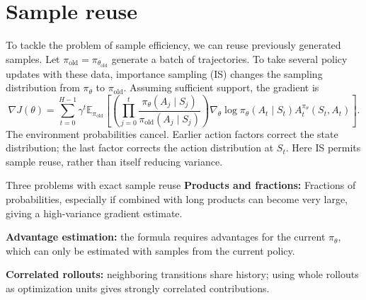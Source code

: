 \documentclass[11pt,a4paper]{article}
\newcommand{\E}{\mathbb{E}}
\newcommand{\old}{\mathrm{old}}
\newcommand{\nexttopic}{\clearpage}
\begin{document}
\nexttopic
\section{Sample reuse}
To tackle the problem of sample efficiency, we can reuse previously generated samples. 
Let $\pi_\old=\pi_{\theta_\old}$ generate a batch of trajectories. To take several policy updates
with these data, importance sampling (IS) changes the sampling distribution
from $\pi_\theta$ to $\pi_\old$. Assuming sufficient support, the gradient is
\begin{equation}\label{eq:exactis}
 \nabla J(\theta)=\sum_{t=0}^{H-1}\gamma^t\E_{\pi_\old}\!\left[
 \left(\prod_{j=0}^{t}\frac{\pi_\theta(A_j\mid S_j)}{\pi_\old(A_j\mid S_j)}\right)
 \nabla_\theta\log\pi_\theta(A_t\mid S_t)A_t^{\pi_\theta}(S_t,A_t)\right].
\end{equation}
The environment probabilities cancel. Earlier action factors correct the
state distribution; the last factor corrects the action distribution at $S_t$.
Here IS permits sample reuse, rather than itself reducing variance.

\begin{idea}{Three problems with exact sample reuse}
\textbf{Products and fractions:} Fractions of probabilities, especially if 
combined with long products can become very large, giving a
high-variance gradient estimate.\par
\textbf{Advantage estimation:} the formula
requires advantages for the current $\pi_\theta$, which can only be estimated with
samples from the current policy.\par
\textbf{Correlated rollouts:} neighboring transitions share history; using
whole rollouts as optimization units gives strongly correlated contributions.
\end{idea}
\end{document}
